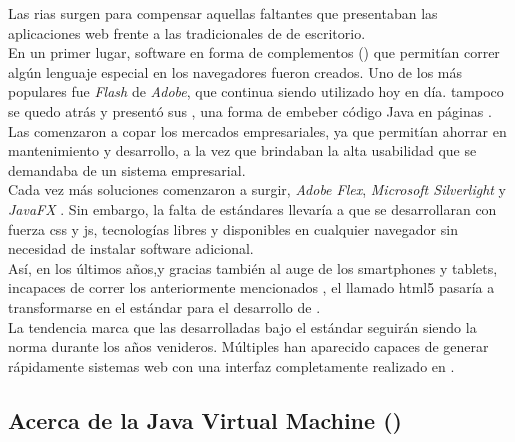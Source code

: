 Las \glspl{ria} surgen para compensar aquellas faltantes que
presentaban las aplicaciones web frente a las tradicionales de \clientserver de
escritorio.\\
En un primer lugar, software en forma de complementos (\plugins) que permitían correr
algún lenguaje especial en los navegadores
fueron creados. Uno de los más populares fue \emph{Flash} de \emph{Adobe}, que continua
siendo utilizado hoy en día. \java tampoco se quedo atrás y presentó sus \servlets,
una forma de embeber código Java en páginas \html.\\
Las \ria comenzaron a copar los mercados empresariales, ya que permitían ahorrar
en mantenimiento y desarrollo, a la vez que brindaban la alta usabilidad que se demandaba
de un sistema empresarial.\\
Cada vez más soluciones comenzaron a surgir, \emph{Adobe Flex},
\emph{Microsoft Silverlight} y \emph{JavaFX} . Sin embargo, la
falta de estándares llevaría a que se desarrollaran con fuerza \gls{css} y
\gls{js}, tecnologías libres y disponibles en cualquier navegador sin necesidad de
instalar software adicional.\\
Así, en los últimos años,y gracias también al auge de los smartphones y tablets, incapaces
de correr los anteriormente mencionados \plugins, el llamado \gls{html5}
pasaría a transformarse en el estándar para el desarrollo de \rias
{}.\\
La tendencia marca que las \rias desarrolladas bajo el estándar \htmlv seguirán siendo la
norma durante los años venideros. Múltiples \frameworks han aparecido capaces de generar
rápidamente sistemas web con una interfaz completamente realizado en \htmlv.\\



\subsection{Acerca de la Java Virtual Machine (\jvm)}
\label{subsec:intro:about_jvm}

